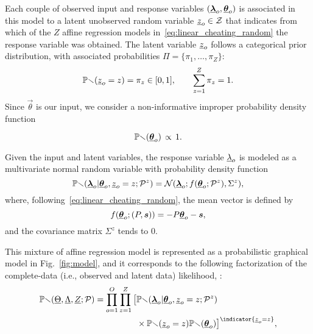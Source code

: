 \documentclass{ifacconf}  %
\begin{document}
Each couple of observed input and response variables $(    {\underline{\boldsymbol{\lambda}}}_{o}, {\underline{\boldsymbol{\theta}}}_{o})$ is associated in this model to a latent unobserved random variable ${\underline{z}_{o}\in\mathcal{Z}}$ that indicates from which of the $Z$ affine regression models in~\eqref{eq:linear_cheating_random} the response variable was obtained.
The latent variable $\underline{z}_{o}$ follows a categorical prior distribution, with associated probabilities ${\Pi=\{\pi_{1},\dots,\pi_{Z}\}}$:
   \begin{equation}
     \label{eq:prob_zo_equal_z}
\mathbb{Pr}(\underline{z}_{o}=z)=\pi_{z} \in [0,1], \qquad \sum_{z=1}^{Z} \pi_{z} = 1.
\end{equation}
Since $\vec{\theta}$ is our input,
we consider a non-informative improper probability density function~\cite{ChristensenEtAl2010}

\begin{equation}
  \label{eq:theta_almost_surely}
  \mathbb{Pr}({\underline{\boldsymbol{\theta}}}_{o}) \,\propto \,1.
\end{equation}

Given the input and latent variables, the response variable $\underline{\lambda}_{o}$ is modeled as a multivariate normal random variable with probability density function
\begin{equation}
  \label{eq:multivariate_gaussian}
\mathbb{Pr}({\underline{\boldsymbol{\lambda}}}_{o}|{\underline{\boldsymbol{\theta}}}_{o},\underline{z}_{o}=z; \mathcal{P}^{z}) = \mathcal{N}({\underline{\boldsymbol{\lambda}}}_{o};f({\underline{\boldsymbol{\theta}}}_{o};\mathcal{P}^{z}),{\Sigma^{z}}),
\end{equation}
where, following~\eqref{eq:linear_cheating_random}, the mean vector is defined by
\[f({\underline{\boldsymbol{\theta}}}_{o};(P,\boldsymbol{s}))=-{P}{\underline{\boldsymbol{\theta}}}_{o}-{\boldsymbol{s}},\]
and the covariance matrix ${\Sigma^{z}}$ tends to $0$.

This mixture of affine regression model is represented as a probabilistic graphical model in Fig.~\ref{fig:model}, and it corresponds to the following factorization of the complete-data (i.e., observed and latent data) likelihood, \cite{Bishop2006}:
\begin{align}\label{eq:completedataLikelihood}
  \probability{\random{\Theta},\random{\Lambda},\random{Z};\set{P}}= \prod_{o=1}^{O}\prod_{z=1}^{Z}\big[&\probability{\randomvec{\lambda}_{o}|\randomvec{\theta}_{o},\random{z}_{o}=z;\set{P}^{z}} \nonumber \\
& \times \probability{\random{z}_{o}=z}\probability{\randomvec{\theta}_{o}}\big]^{\indicator{\random{z}_{o}=z}},
\end{align}
\end{document}
